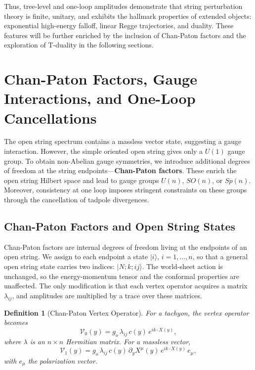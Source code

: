 \documentclass[11pt]{article}
\newtheorem{definition}{Definition}
\begin{document}
Thus, tree-level and one-loop amplitudes demonstrate that string perturbation theory is finite, unitary, and exhibits the hallmark properties of extended objects: exponential high-energy falloff, linear Regge trajectories, and duality. These features will be further enriched by the inclusion of Chan-Paton factors and the exploration of T-duality in the following sections.

\section{Chan-Paton Factors, Gauge Interactions, and One-Loop Cancellations}

The open string spectrum contains a massless vector state, suggesting a gauge interaction. However, the simple oriented open string gives only a $U(1)$ gauge group. To obtain non-Abelian gauge symmetries, we introduce additional degrees of freedom at the string endpoints—\textbf{Chan-Paton factors}. These enrich the open string Hilbert space and lead to gauge groups $U(n)$, $SO(n)$, or $Sp(n)$. Moreover, consistency at one loop imposes stringent constraints on these groups through the cancellation of tadpole divergences.

\subsection{Chan-Paton Factors and Open String States}

Chan-Paton factors are internal degrees of freedom living at the endpoints of an open string. We assign to each endpoint a state $|i\rangle$, $i=1,\dots,n$, so that a general open string state carries two indices: $|N; k; ij\rangle$. The world-sheet action is unchanged, so the energy-momentum tensor and the conformal properties are unaffected. The only modification is that each vertex operator acquires a matrix $\lambda_{ij}$, and amplitudes are multiplied by a trace over these matrices.

\begin{definition}[Chan-Paton Vertex Operator]
For a tachyon, the vertex operator becomes
\begin{equation}
\mathcal{V}_0(y) = g_o \, \lambda_{ij} \, c(y) \, e^{ik\cdot X(y)},
\end{equation}
where $\lambda$ is an $n\times n$ Hermitian matrix. For a massless vector,
\begin{equation}
\mathcal{V}_1(y) = g_o \, \lambda_{ij} \, c(y) \, \partial_y X^\mu(y) \, e^{ik\cdot X(y)} \, e_\mu,
\end{equation}
with $e_\mu$ the polarization vector.
\end{definition}
\end{document}
